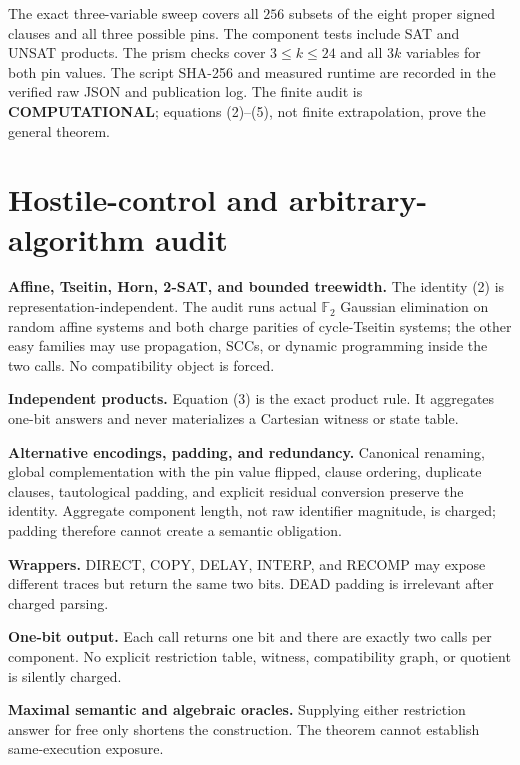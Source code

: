 \documentclass[11pt]{article}
\newcommand{\COMP}{\textbf{COMPUTATIONAL}}
\begin{document}
The exact three-variable sweep covers all $256$ subsets of the eight proper
signed clauses and all three possible pins.  The component tests include SAT
and UNSAT products.  The prism checks cover $3\le k\le24$ and all $3k$
variables for both pin values.  The script SHA-256 and measured runtime are
recorded in the verified raw JSON and publication log.
The finite audit is \COMP; equations (2)--(5), not finite extrapolation, prove
the general theorem.

\section{Hostile-control and arbitrary-algorithm audit}

\begin{description}[leftmargin=0cm,labelwidth=0cm]
\item[] \textbf{Affine, Tseitin, Horn, 2-SAT, and bounded treewidth.}
The identity (2) is representation-independent.  The audit runs actual
$\mathbb F_2$ Gaussian elimination on random affine systems and both charge
parities of cycle-Tseitin systems; the other easy families may use
propagation, SCCs, or dynamic programming inside the two calls.  No
compatibility object is forced.
\item[] \textbf{Independent products.}
Equation (3) is the exact product rule.  It aggregates one-bit answers and
never materializes a Cartesian witness or state table.
\item[] \textbf{Alternative encodings, padding, and redundancy.}
Canonical renaming, global complementation with the pin value flipped,
clause ordering, duplicate clauses, tautological padding, and explicit
residual conversion preserve the identity.  Aggregate component length, not
raw identifier magnitude, is charged; padding therefore cannot create a
semantic obligation.
\item[] \textbf{Wrappers.}
DIRECT, COPY, DELAY, INTERP, and RECOMP may expose different traces but
return the same two bits.  DEAD padding is irrelevant after charged parsing.
\item[] \textbf{One-bit output.}
Each call returns one bit and there are exactly two calls per component.
No explicit restriction table, witness, compatibility graph, or quotient is
silently charged.
\item[] \textbf{Maximal semantic and algebraic oracles.}
Supplying either restriction answer for free only shortens the construction.
The theorem cannot establish same-execution exposure.
\end{description}
\end{document}
